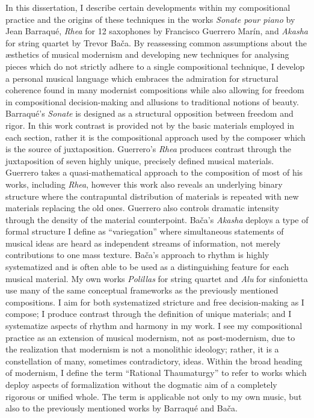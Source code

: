 
In this dissertation, I describe certain developments within my compositional practice and the origins of these techniques in the works \textit{Sonate pour piano} by Jean Barraqué, \textit{Rhea} for 12 saxophones by Francisco Guerrero Marín, and \textit{Akasha} for string quartet by Trevor Bača. By reassessing common assumptions about the æsthetics of musical modernism and developing new techniques for analysing pieces which do not strictly adhere to a single compositional technique, I develop a personal musical language which embraces the admiration for structural coherence found in many modernist compositions while also allowing for freedom in compositional decision-making and allusions to traditional notions of beauty. Barraqué's \textit{Sonate} is designed as a structural opposition between freedom and rigor. In this work contrast is provided not by the basic materials employed in each section, rather it is the compositional approach used by the composer which is the source of juxtaposition. Guerrero's \textit{Rhea} produces contrast through the juxtaposition of seven highly unique, precisely defined musical materials. Guerrero takes a quasi-mathematical approach to the composition of most of his works, including \textit{Rhea}, however this work also reveals an underlying binary structure where the contrapuntal distribution of materials is repeated with new materials replacing the old ones. Guerrero also controls dramatic intensity through the density of the material counterpoint. Bača's \textit{Akasha} deploys a type of formal structure I define as ``variegation'' where simultaneous statements of musical ideas are heard as independent streams of information, not merely contributions to one mass texture. Bača's approach to rhythm is highly systematized and is often able to be used as a distinguishing feature for each musical material. My own works \textit{Polillas} for string quartet and \textit{Alu} for sinfonietta use many of the same conceptual frameworks as the previously mentioned compositions. I aim for both systematized stricture and free decision-making as I compose; I produce contrast through the definition of unique materials; and I systematize aspects of rhythm and harmony in my work. I see my compositional practice as an extension of musical modernism, not as post-modernism, due to the realization that modernism is not a monolithic ideology; rather, it is a constellation of many, sometimes contradictory, ideas. Within the broad heading of modernism, I define the term ``Rational Thaumaturgy'' to refer to works which deploy aspects of formalization without the dogmatic aim of a completely rigorous or unified whole. The term is applicable not only to my own music, but also to the previously mentioned works by Barraqué and Bača.
